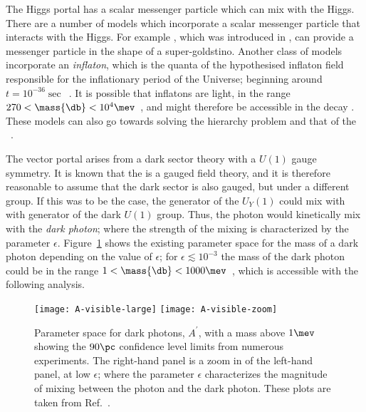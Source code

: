 The Higgs portal has a scalar messenger particle which can mix with the \sm Higgs.
There are a number of models which incorporate a scalar messenger particle that interacts with the
Higgs.
For example \SUSY, which was introduced in , can provide a messenger particle in
the shape of a super-goldstino.
Another class of models incorporate an \emph{inflaton}, which is the quanta of the hypothesised
inflaton field responsible for the inflationary period of the Universe; beginning around
$t=10^{-36}\sec$~\cite{Bezrukov:2009yw}.
It is possible that inflatons are light, in the range
$270<\mass{\db}<10^{4}\mev$~\cite{Bezrukov:2009yw}, and might therefore be accessible in the decay
\btokstrdb.
These models can also go towards solving the hierarchy problem and that of the
\BAU~\cite{Hertzberg:2013mba,Hertzberg:2013jba}.

The vector portal arises from a dark sector theory with a $U(1)$ gauge symmetry.
It is known that the \sm is a gauged field theory, and it is therefore reasonable to assume that
the dark sector is also gauged, but under a different group.
If this was to be the case, the generator of the \sm $U_Y(1)$ could mix with with generator of the
dark $U(1)$ group.
Thus, the photon would kinetically mix with the \emph{dark photon}; where the strength of the
mixing is characterized by the parameter $\epsilon$.
Figure~\ref{fig:db:darkphotonlimits} shows the existing parameter space for the mass of a dark
photon depending on the value of $\epsilon$; for $\epsilon\lesssim10^{-3}$ the mass of the dark
photon could be in the range $1<\mass{\db}<1000\mev$~\cite{Essig:2013lka}, which is accessible with
the following analysis.

\begin{figure}
  \begin{center}
    \texttt{[image: A-visible-large]}
    \texttt{[image: A-visible-zoom]}
    \caption{
      Parameter space for dark photons, $A^\prime$, with a mass above $1\mev$ showing the $90\pc$
      confidence level limits from numerous experiments.
      The right-hand panel is a zoom in of the left-hand panel, at low $\epsilon$; where
      the parameter $\epsilon$ characterizes the magnitude of mixing between the \sm photon and the
      dark photon.
      These plots are taken from Ref.~\protect\cite{Essig:2013lka}.
    }
    \label{fig:db:darkphotonlimits}
  \end{center}
\end{figure}


